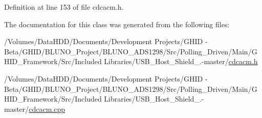 \-Definition at line 153 of file cdcacm.\-h.



\-The documentation for this class was generated from the following files\-:\begin{DoxyCompactItemize}
\item 
/\-Volumes/\-Data\-H\-D\-D/\-Documents/\-Development Projects/\-G\-H\-I\-D -\/ Beta/\-G\-H\-I\-D/\-B\-L\-U\-N\-O\-\_\-\-Project/\-B\-L\-U\-N\-O\-\_\-\-A\-D\-S1298/\-Src/\-Polling\-\_\-\-Driven/\-Main/\-G\-H\-I\-D\-\_\-\-Framework/\-Src/\-Included Libraries/\-U\-S\-B\-\_\-\-Host\-\_\-\-Shield\-\_.-\/master/\hyperlink{cdcacm_8h}{cdcacm.\-h}\item 
/\-Volumes/\-Data\-H\-D\-D/\-Documents/\-Development Projects/\-G\-H\-I\-D -\/ Beta/\-G\-H\-I\-D/\-B\-L\-U\-N\-O\-\_\-\-Project/\-B\-L\-U\-N\-O\-\_\-\-A\-D\-S1298/\-Src/\-Polling\-\_\-\-Driven/\-Main/\-G\-H\-I\-D\-\_\-\-Framework/\-Src/\-Included Libraries/\-U\-S\-B\-\_\-\-Host\-\_\-\-Shield\-\_.-\/master/\hyperlink{cdcacm_8cpp}{cdcacm.\-cpp}\end{DoxyCompactItemize}
